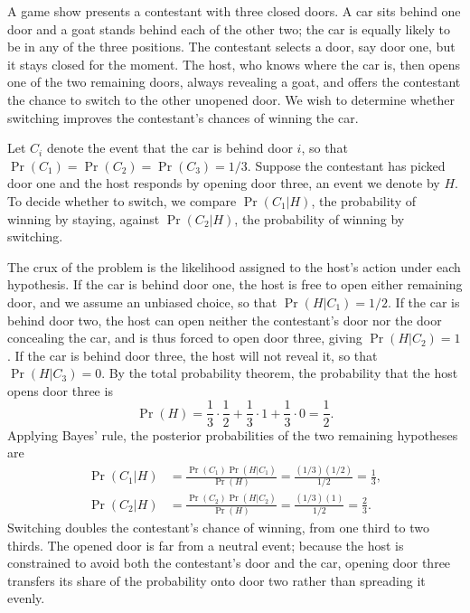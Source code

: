 \begin{example} 
A game show presents a contestant with three closed doors.
A car sits behind one door and a goat stands behind each of the other two;
the car is equally likely to be in any of the three positions.
The contestant selects a door, say door one, but it stays closed for the moment.
The host, who knows where the car is, then opens one of the two remaining doors, always revealing a goat, and offers the contestant the chance to switch to the other unopened door.
We wish to determine whether switching improves the contestant's chances of winning the car.

Let $C_i$ denote the event that the car is behind door $i$, so that $\Pr (C_1) = \Pr (C_2) = \Pr (C_3) = 1/3$.
Suppose the contestant has picked door one and the host responds by opening door three, an event we denote by $H$.
To decide whether to switch, we compare $\Pr (C_1 | H)$, the probability of winning by staying, against $\Pr (C_2 | H)$, the probability of winning by switching.

The crux of the problem is the likelihood assigned to the host's action under each hypothesis.
If the car is behind door one, the host is free to open either remaining door, and we assume an unbiased choice, so that $\Pr (H | C_1) = 1/2$.
If the car is behind door two, the host can open neither the contestant's door nor the door concealing the car, and is thus forced to open door three, giving $\Pr (H | C_2) = 1$.
If the car is behind door three, the host will not reveal it, so that $\Pr (H | C_3) = 0$.
By the total probability theorem, the probability that the host opens door three is
\begin{equation*}
\Pr (H)
= \frac{1}{3} \cdot \frac{1}{2}
+ \frac{1}{3} \cdot 1
+ \frac{1}{3} \cdot 0
= \frac{1}{2} .
\end{equation*}
Applying Bayes' rule, the posterior probabilities of the two remaining hypotheses are
\begin{align*}
\Pr (C_1 | H) &= \frac{ \Pr (C_1) \Pr (H | C_1) }{ \Pr (H) }
= \frac{ (1/3)(1/2) }{ 1/2 } = \frac{1}{3} , \\
\Pr (C_2 | H) &= \frac{ \Pr (C_2) \Pr (H | C_2) }{ \Pr (H) }
= \frac{ (1/3)(1) }{ 1/2 } = \frac{2}{3} .
\end{align*}
Switching doubles the contestant's chance of winning, from one third to two thirds.
The opened door is far from a neutral event;
because the host is constrained to avoid both the contestant's door and the car, opening door three transfers its share of the probability onto door two rather than spreading it evenly.
\end{example}


